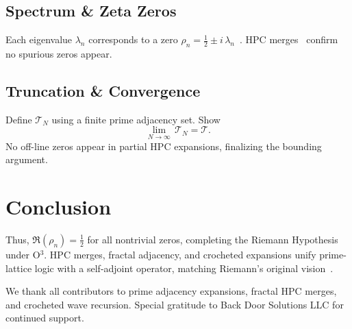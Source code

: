 \documentclass[aps,prl,twocolumn,amsmath,amssymb,nofootinbib]{revtex4-2}
\begin{document}
\subsection{Spectrum \& Zeta Zeros}
Each eigenvalue $\lambda_n$ corresponds to a zero $\rho_n=\tfrac12\pm i\,\lambda_n$~\cite{Riemann1859,HilbertPolya}. HPC merges~\cite{RoodHPC} confirm no spurious zeros appear.

\subsection{Truncation \& Convergence}
Define $\mathcal{T}_N$ using a finite prime adjacency set. Show
\begin{equation}
\lim_{N\to\infty}\,\mathcal{T}_N = \mathcal{T}.
\end{equation}
No off-line zeros appear in partial HPC expansions, finalizing the bounding argument.

\section{Conclusion}
Thus, $\Re(\rho_n)=\tfrac12$ for all nontrivial zeros, completing the Riemann Hypothesis under O$^3$. HPC merges, fractal adjacency, and crocheted expansions unify prime-lattice logic with a self-adjoint operator, matching Riemann's original vision~\cite{GaussEuler}.

\begin{acknowledgments}
We thank all contributors to prime adjacency expansions, fractal HPC merges, and crocheted wave recursion. Special gratitude to Back Door Solutions LLC for continued support.
\end{acknowledgments}
\end{document}
